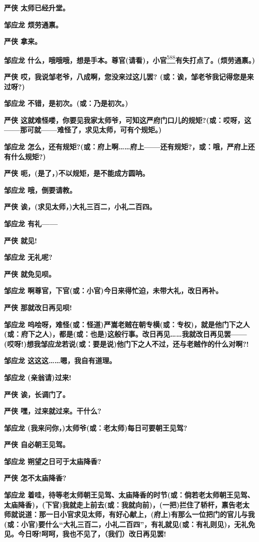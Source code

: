 \textbf{严侠 太师已经升堂。}

\textbf{邹应龙 烦劳通禀。}

\textbf{严侠 拿来。}

\textbf{邹应龙
什么，哦哦哦，想是手本。尊官(请看)，小官}\protect\hyperlink{fn588}{\textsuperscript{588}}\textbf{有失打点了。(烦劳通禀。)}

\textbf{严侠 哎，我说邹老爷，八成啊，您没来过这儿罢?
(或：诶，邹老爷我记得您是来过呀?)}

\textbf{邹应龙 不错，是初次。(或：乃是初次。)}

\textbf{严侠
这就难怪喽，你要见我家太师爷，可知这严府门口儿的规矩?(或：哎呀，这------那可就------难怪了，求见太师，可有个规矩。)}

\textbf{邹应龙
怎么，还有规矩?(或：府上啊\ldots{}\ldots{}府上------还有规矩?，或：哦，严府上还有什么规矩?)}

\textbf{严侠 呃，(是了，)不以规矩，是不能成方圆呐。}

\textbf{邹应龙 哦，倒要请教。}

\textbf{严侠 诶，(求见太师，)大礼三百二，小礼二百四。}

\textbf{邹应龙 有礼------}

\textbf{严侠 就见!}

\textbf{邹应龙 无礼呢?}

\textbf{严侠 就免见呗。}

\textbf{邹应龙 啊尊官，下官(或：小官)今日来得忙迫，未带大礼，改日再补。}

\textbf{严侠 那就改日再见呗!}

\textbf{邹应龙
呜哙呀，难怪(或：怪道)严嵩老贼在朝专横(或：专权)，就是他门下之人(或：府下之人)，都是(或：也是)这般行事。改日再见\ldots{}\ldots{}我就改日再见罢------(哎呀!)想我邹应龙若说(或：要是说)他门下之人不过，还与老贼作的什么对啊?!}

\textbf{邹应龙 这这这\ldots{}\ldots{}嗯，我自有道理。}

\textbf{邹应龙 (亲翁请)过来!}

\textbf{严侠 诶，长调门了。}

\textbf{严侠 嘿，过来就过来。干什么?}

\textbf{邹应龙 (我来问你，)太师爷(或：老太师)每日可要朝王见驾?}

\textbf{严侠 自必朝王见驾。}

\textbf{邹应龙 朔望之日可于太庙降香?}

\textbf{严侠 怎不太庙降香?}

\textbf{邹应龙
着哇，待等老太师朝王见驾、太庙降香的时节(或：倘若老太师朝王见驾、太庙降香)，(下官)我就走上前去(或：我就向前)，(一把)拦住了轿杆，禀告老太师就说道：那一日小官求见太师，有好心献上，(府上)有那么一位把门的官儿与我(或：小官)要什么``大礼三百二，小礼二百四''，有礼就见(或：有礼则见)，无礼免见。今日呀!呵呵，我也不见了，（我们）改日再见罢!}

